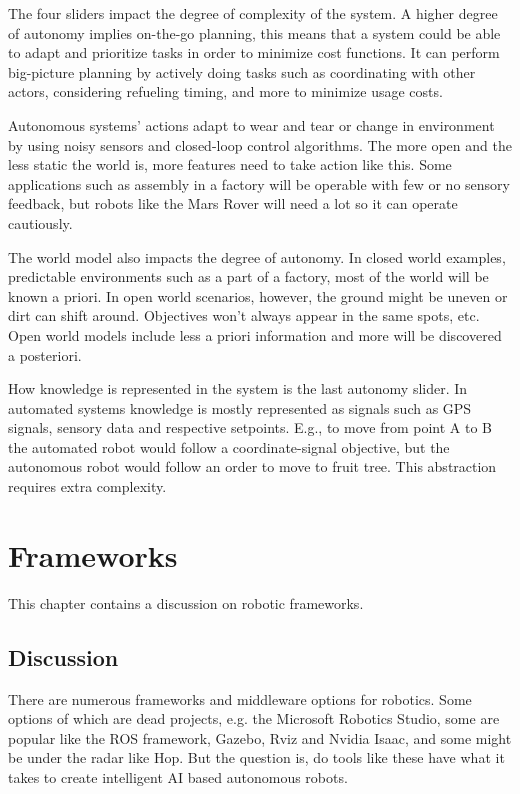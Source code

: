 \documentclass[%
oneside,    %
project,    %
nosummary   %
]{USN-MSc}
\begin{document}
The four sliders impact the degree of complexity of the system.
A higher degree of autonomy implies on-the-go planning, this means that a system could be able to adapt and prioritize tasks in order to minimize cost functions. It can perform big-picture planning by actively doing tasks such as coordinating with other actors, considering refueling timing, and more to minimize usage costs.

Autonomous systems' actions adapt to wear and tear or change in environment by using noisy sensors and closed-loop control algorithms. The more open and the less static the world is, more features need to take action like this. Some applications such as assembly in a factory will be operable with few or no sensory feedback, but robots like the Mars Rover will need a lot so it can operate cautiously.

The world model also impacts the degree of autonomy. In closed world examples, predictable environments such as a part of a factory, most of the world will be known a priori. In open world scenarios, however, the ground might be uneven or dirt can shift around. Objectives won't always appear in the same spots, etc. Open world models include less a priori information and more will be discovered a posteriori.

How knowledge is represented in the system is the last autonomy slider. In automated systems knowledge is mostly represented as signals such as GPS signals, sensory data and respective setpoints. E.g., to move from point A to B the automated robot would follow a coordinate-signal objective, but the autonomous robot would follow an order to move to fruit tree. This abstraction requires extra complexity.

\chapter{Frameworks}
\label{ch:frame}
This chapter contains a discussion on robotic frameworks.
\section{Discussion}

There are numerous frameworks and middleware options for robotics. Some options of which are dead projects, e.g. the Microsoft Robotics Studio, some are popular like the ROS framework, Gazebo, Rviz and Nvidia Isaac, and some might be under the radar like Hop. But the question is, do tools like these have what it takes to create intelligent AI based autonomous robots.
\end{document}

